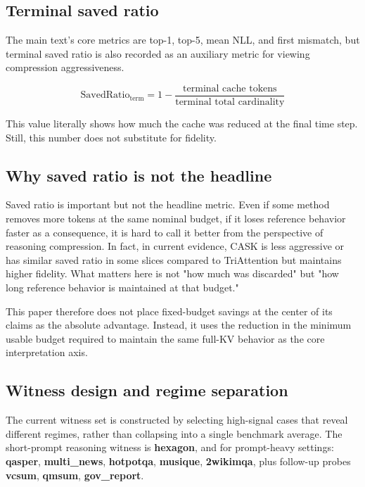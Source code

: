 \subsection{Terminal saved ratio}


The main text's core metrics are top-1, top-5, mean NLL, and first mismatch, but terminal saved ratio is also recorded as an auxiliary metric for viewing compression aggressiveness.


$$
\mathrm{SavedRatio}_{\mathrm{term}}
=
1 - \frac{\text{terminal cache tokens}}{\text{terminal total cardinality}}
$$


This value literally shows how much the cache was reduced at the final time step. Still, this number does not substitute for fidelity.


\subsection{Why saved ratio is not the headline}


Saved ratio is important but not the headline metric. Even if some method removes more tokens at the same nominal budget, if it loses reference behavior faster as a consequence, it is hard to call it better from the perspective of reasoning compression. In fact, in current evidence, CASK is less aggressive or has similar saved ratio in some slices compared to TriAttention but maintains higher fidelity. What matters here is not "how much was discarded" but "how long reference behavior is maintained at that budget."


This paper therefore does not place fixed-budget savings at the center of its claims as the absolute advantage. Instead, it uses the reduction in the minimum usable budget required to maintain the same full-KV behavior as the core interpretation axis.


\subsection{Witness design and regime separation}


The current witness set is constructed by selecting high-signal cases that reveal different regimes, rather than collapsing into a single benchmark average. The short-prompt reasoning witness is \textbf{hexagon}, and for prompt-heavy settings: \textbf{qasper}, \textbf{multi\_news}, \textbf{hotpotqa}, \textbf{musique}, \textbf{2wikimqa}, plus follow-up probes \textbf{vcsum}, \textbf{qmsum}, \textbf{gov\_report}.



